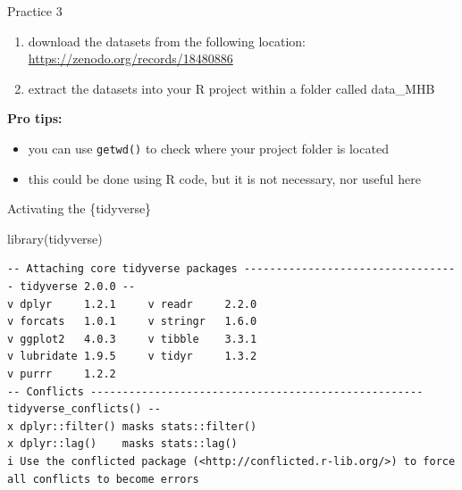 \documentclass[
  ignorenonframetext,
  aspectratio=169,
]{beamer}
\newenvironment{Shaded}{\begin{snugshade}}{\end{snugshade}}
\newcommand{\FunctionTok}[1]{\textcolor[rgb]{0.28,0.35,0.67}{#1}}
\newcommand{\NormalTok}[1]{\textcolor[rgb]{0.00,0.23,0.31}{#1}}
\providecommand{\tightlist}{%
  \setlength{\itemsep}{0pt}\setlength{\parskip}{0pt}}
\let\oldtexttt\texttt
\renewcommand{\texttt}[1]{\colorbox{gray!20}{\oldtexttt{#1}}}
\begin{document}
\begin{frame}[fragile]{Practice 3}
\protect{}\label{practice-3}
\begin{enumerate}
\tightlist
\item
  download the datasets from the following location:
  \url{https://zenodo.org/records/18480886}
\item
  extract the datasets into your R project within a folder called
  data\_MHB
\end{enumerate}

\pause

\vspace{1cm}

\textbf{Pro tips:}

\begin{itemize}
\tightlist
\item
  you can use \texttt{getwd()} to check where your project folder is
  located
\item
  this could be done using R code, but it is not necessary, nor useful
  here
\end{itemize}
\end{frame}

\begin{frame}[fragile]{Activating the \{tidyverse\}}
\protect{}\label{activating-the-tidyverse}
\footnotesize

\begin{Shaded}
\begin{Highlighting}[]
\FunctionTok{library}\NormalTok{(tidyverse)}
\end{Highlighting}
\end{Shaded}

\begin{verbatim}
-- Attaching core tidyverse packages ---------------------------------- tidyverse 2.0.0 --
v dplyr     1.2.1     v readr     2.2.0
v forcats   1.0.1     v stringr   1.6.0
v ggplot2   4.0.3     v tibble    3.3.1
v lubridate 1.9.5     v tidyr     1.3.2
v purrr     1.2.2     
-- Conflicts ---------------------------------------------------- tidyverse_conflicts() --
x dplyr::filter() masks stats::filter()
x dplyr::lag()    masks stats::lag()
i Use the conflicted package (<http://conflicted.r-lib.org/>) to force all conflicts to become errors
\end{verbatim}

\normalsize
\end{frame}
\end{document}
